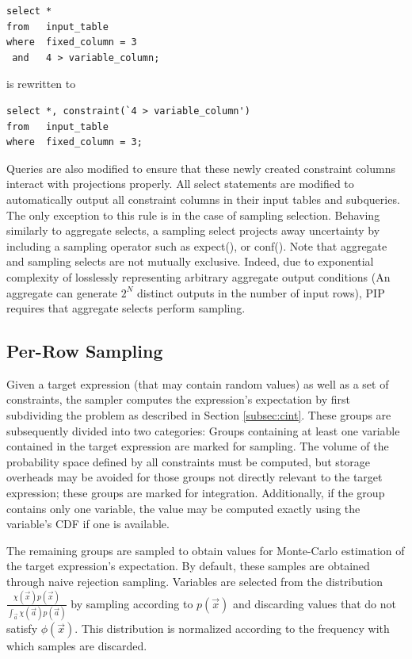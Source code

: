 \begin{verbatim}
select *
from   input_table
where  fixed_column = 3
 and   4 > variable_column;
\end{verbatim}
%
is rewritten to
%
\begin{verbatim}
select *, constraint(`4 > variable_column')
from   input_table
where  fixed_column = 3;
\end{verbatim}

Queries are also modified to ensure that these newly created constraint columns interact with projections properly.  All select statements are modified to automatically output all constraint columns in their input tables and subqueries.  The only exception to this rule is in the case of sampling selection.  Behaving similarly to aggregate selects, a sampling select projects away uncertainty by including a sampling operator such as expect(), or conf().  Note that aggregate and sampling selects are not mutually exclusive.  Indeed, due to exponential complexity of losslessly representing arbitrary aggregate output conditions (An aggregate can generate $2^{N}$ distinct outputs in the number of input rows), PIP requires that aggregate selects perform sampling. 

\subsection{Per-Row Sampling}
Given a target expression (that may contain random values) as well as a set of constraints, the sampler computes the expression's expectation by first subdividing the problem as described in Section \ref{subsec:cint}.  These groups are subsequently divided into two categories: Groups containing at least one variable contained in the target expression are marked for sampling.  The volume of the probability space defined by all constraints must be computed, but storage overheads may be avoided for those groups not directly relevant to the target expression; these groups are marked for integration.  Additionally, if the group contains only one variable, the value may be computed exactly using the variable's CDF if one is available.

The remaining groups are sampled to obtain values for Monte-Carlo estimation of the target expression's expectation.  By default, these samples are obtained through naive rejection sampling.  Variables are selected from the distribution $\frac{\chi(\vec{x})p(\vec{x})}{\int_{\vec{a}} \chi(\vec{a})p(\vec{a})}$ by sampling according to $p(\vec{x})$ and discarding values that do not satisfy $\phi(\vec{x})$.  This distribution is normalized according to the frequency with which samples are discarded.  

